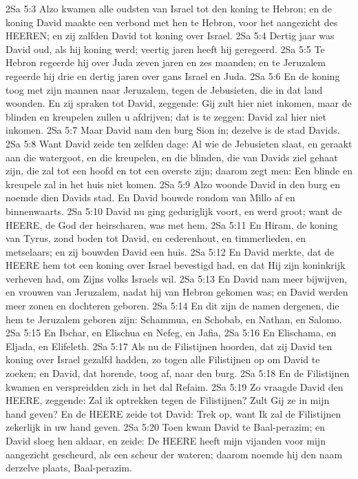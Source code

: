 2Sa 5:3  Alzo kwamen alle oudsten van Israel tot den koning te Hebron; en de koning David maakte een verbond met hen te Hebron, voor het aangezicht des HEEREN; en zij zalfden David tot koning over Israel.
2Sa 5:4  Dertig jaar was David oud, als hij koning werd; veertig jaren heeft hij geregeerd.
2Sa 5:5  Te Hebron regeerde hij over Juda zeven jaren en zes maanden; en te Jeruzalem regeerde hij drie en dertig jaren over gans Israel en Juda.
2Sa 5:6  En de koning toog met zijn mannen naar Jeruzalem, tegen de Jebusieten, die in dat land woonden. En zij spraken tot David, zeggende: Gij zult hier niet inkomen, maar de blinden en kreupelen zullen u afdrijven; dat is te zeggen: David zal hier niet inkomen.
2Sa 5:7  Maar David nam den burg Sion in; dezelve is de stad Davids.
2Sa 5:8  Want David zeide ten zelfden dage: Al wie de Jebusieten slaat, en geraakt aan die watergoot, en die kreupelen, en die blinden, die van Davids ziel gehaat zijn, die zal tot een hoofd en tot een overste zijn; daarom zegt men: Een blinde en kreupele zal in het huis niet komen.
2Sa 5:9  Alzo woonde David in den burg en noemde dien Davids stad. En David bouwde rondom van Millo af en binnenwaarts.
2Sa 5:10  David nu ging geduriglijk voort, en werd groot; want de HEERE, de God der heirscharen, was met hem.
2Sa 5:11  En Hiram, de koning van Tyrus, zond boden tot David, en cederenhout, en timmerlieden, en metselaars; en zij bouwden David een huis.
2Sa 5:12  En David merkte, dat de HEERE hem tot een koning over Israel bevestigd had, en dat Hij zijn koninkrijk verheven had, om Zijns volks Israels wil.
2Sa 5:13  En David nam meer bijwijven, en vrouwen van Jeruzalem, nadat hij van Hebron gekomen was; en David werden meer zonen en dochteren geboren.
2Sa 5:14  En dit zijn de namen dergenen, die hem te Jeruzalem geboren zijn: Schammua, en Schobab, en Nathan, en Salomo.
2Sa 5:15  En Ibchar, en Elischua en Nefeg, en Jafia,
2Sa 5:16  En Elischama, en Eljada, en Elifeleth.
2Sa 5:17  Als nu de Filistijnen hoorden, dat zij David ten koning over Israel gezalfd hadden, zo togen alle Filistijnen op om David te zoeken; en David, dat horende, toog af, naar den burg.
2Sa 5:18  En de Filistijnen kwamen en verspreidden zich in het dal Refaim.
2Sa 5:19  Zo vraagde David den HEERE, zeggende: Zal ik optrekken tegen de Filistijnen? Zult Gij ze in mijn hand geven? En de HEERE zeide tot David: Trek op, want Ik zal de Filistijnen zekerlijk in uw hand geven.
2Sa 5:20  Toen kwam David te Baal-perazim; en David sloeg hen aldaar, en zeide: De HEERE heeft mijn vijanden voor mijn aangezicht gescheurd, als een scheur der wateren; daarom noemde hij den naam derzelve plaats, Baal-perazim.
